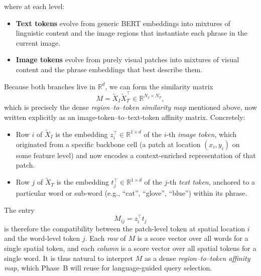 \begin{enrichment}
\begin{enrichment}[Method][subsection]
		\newpage
		
		where at each level:
		\begin{itemize}
			\item \textbf{Text tokens} evolve from generic BERT embeddings into mixtures of linguistic content and the image regions that instantiate each phrase in the current image.
			\item \textbf{Image tokens} evolve from purely visual patches into mixtures of visual content and the phrase embeddings that best describe them.
		\end{itemize}
		Because both branches live in \(\mathbb{R}^{d}\), we can form the similarity matrix
		\[
		M = \tilde{X}_I \tilde{X}_T^\top \in \mathbb{R}^{N_I \times N_T},
		\]
		which is precisely the dense \emph{region--to--token similarity map} mentioned above, now written explicitly as an image-token–to–text-token affinity matrix. Concretely:
		\begin{itemize}
			\item Row \(i\) of \(\tilde{X}_I\) is the embedding \(z_i^\top \in \mathbb{R}^{1 \times d}\) of the \(i\)-th \emph{image token}, which originated from a specific backbone cell (a patch at location \((x_i,y_i)\) on some feature level) and now encodes a context-enriched representation of that patch.
			\item Row \(j\) of \(\tilde{X}_T\) is the embedding \(t_j^\top \in \mathbb{R}^{1 \times d}\) of the \(j\)-th \emph{text token}, anchored to a particular word or sub-word (e.g., ``cat'', ``glove'', ``blue'') within its phrase.
		\end{itemize}
		The entry
		\[
		M_{ij} = z_i^\top t_j
		\]
		is therefore the compatibility between the patch-level token at spatial location \(i\) and the word-level token \(j\). Each \emph{row} of \(M\) is a score vector over all words for a single spatial token, and each \emph{column} is a score vector over all spatial tokens for a single word. It is thus natural to interpret \(M\) as a dense \emph{region--to--token affinity map}, which Phase~B will reuse for language-guided query selection.
		

\end{enrichment}
\end{enrichment}
